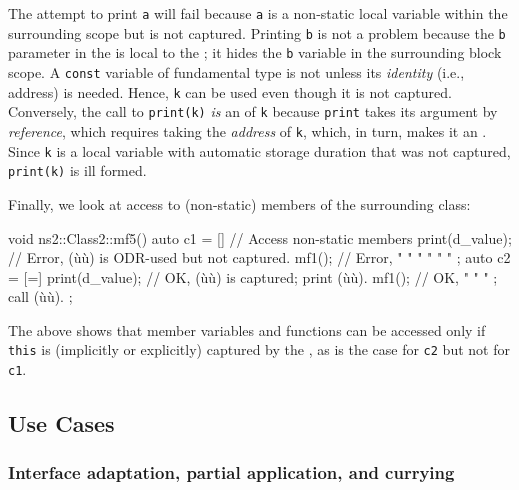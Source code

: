 The attempt to print \lstinline!a! will fail because \lstinline!a! is a
non-static local variable within the surrounding scope but is not
captured. Printing \lstinline!b! is not a problem because the \lstinline!b!
parameter in the  is local to the
; it hides the \lstinline!b! variable in the
surrounding block scope. A \lstinline!const! variable of fundamental type
is not  unless its \emph{identity} (i.e., address) is
needed. Hence, \lstinline!k! can be used even though it is not captured.
Conversely, the call to \lstinline!print(k)! \emph{is} an 
of \lstinline!k! because \lstinline!print! takes its argument by
\emph{reference}, which requires taking the \emph{address} of
\lstinline!k!, which, in turn, makes it an . Since
\lstinline!k! is a local variable with automatic storage duration that was
not captured, \lstinline!print(k)! is ill formed.

Finally, we look at access to (non-static) members of the surrounding
class:

\begin{emcppslisting}
void ns2::Class2::mf5()
{
    auto c1 = []{
        // Access non-static members
        print(d_value); // Error, (ù{}ù) is ODR-used but not captured.
        mf1();          // Error,    "   "        "       "   "     "
    };
    auto c2 = [=] {
        print(d_value); // OK, (ù{}ù) is captured; print (ù{}ù).
        mf1();          // OK,   "    "     "    ; call (ù{}ù).
    };
}
\end{emcppslisting}
    

The above shows that member variables and functions can be accessed only
if \lstinline!this! is (implicitly or explicitly) captured by the
, as is the case for \lstinline!c2! but not for
\lstinline!c1!.

\subsection[Use Cases]{Use Cases}\label{use-cases-lambda}

\subsubsection[Interface adaptation, partial application, and currying]{Interface adaptation, partial application, and currying}\label{interface-adaptation,-partial-application,-and-currying}

